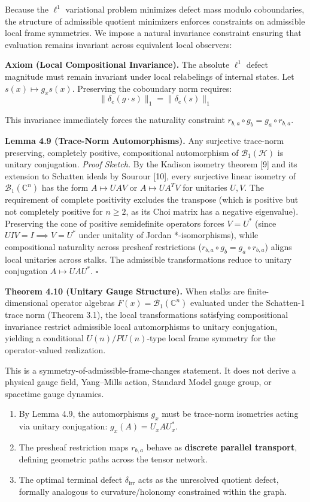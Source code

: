 \documentclass[
]{article}
\providecommand{\tightlist}{%
  \setlength{\itemsep}{0pt}\setlength{\parskip}{0pt}}
\providecommand{\tightlist}{%
  \setlength{\itemsep}{0pt}\setlength{\parskip}{0pt}}
\begin{document}
Because the \(\ell^1\) variational problem minimizes defect mass modulo coboundaries, the structure of admissible quotient minimizers enforces constraints on admissible local frame symmetries. We impose a natural invariance constraint ensuring that evaluation remains invariant across equivalent local observers:

\textbf{Axiom (Local Compositional Invariance).} The absolute \(\ell^1\) defect magnitude must remain invariant under local relabelings of internal states. Let \(s(x) \mapsto g_x s(x)\). Preserving the coboundary norm requires:
\[ \|\delta_e(g \cdot s)\|_1 = \|\delta_e(s)\|_1 \]

This invariance immediately forces the naturality constraint \(r_{b,a} \circ g_b = g_a \circ r_{b,a}\).

\textbf{Lemma 4.9 (Trace-Norm Automorphisms).} Any surjective trace-norm preserving, completely positive, compositional automorphism of \(\mathcal{B}_1(\mathcal{H})\) is unitary conjugation.
\emph{Proof Sketch.} By the Kadison isometry theorem {[}9{]} and its extension to Schatten ideals by Sourour {[}10{]}, every surjective linear isometry of \(\mathcal{B}_1(\mathbb{C}^n)\) has the form \(A \mapsto UAV\) or \(A \mapsto UA^T V\) for unitaries \(U, V\). The requirement of complete positivity excludes the transpose (which is positive but not completely positive for \(n \ge 2\), as its Choi matrix has a negative eigenvalue). Preserving the cone of positive semidefinite operators forces \(V = U^*\) (since \(U I V = I \implies V = U^*\) under unitality of Jordan *-isomorphisms), while compositional naturality across presheaf restrictions (\(r_{b,a} \circ g_b = g_a \circ r_{b,a}\)) aligns local unitaries across stalks. The admissible transformations reduce to unitary conjugation \(A \mapsto UAU^*\). \(\square\)

\textbf{Theorem 4.10 (Unitary Gauge Structure).} When stalks are finite-dimensional operator algebras \(F(x) = \mathcal{B}_1(\mathbb{C}^n)\) evaluated under the Schatten-1 trace norm (Theorem 3.1), the local transformations satisfying compositional invariance restrict admissible local automorphisms to unitary conjugation, yielding a conditional \(U(n)/PU(n)\)-type local frame symmetry for the operator-valued realization.

This is a symmetry-of-admissible-frame-changes statement. It does not derive a physical gauge field, Yang--Mills action, Standard Model gauge group, or spacetime gauge dynamics.

\begin{enumerate}
\def\labelenumi{\arabic{enumi}.}
\tightlist
\item
  By Lemma 4.9, the automorphisms \(g_x\) must be trace-norm isometries acting via unitary conjugation: \(g_x(A) = U_x A U_x^*\).
\item
  The presheaf restriction maps \(r_{b,a}\) behave as \textbf{discrete parallel transport}, defining geometric paths across the tensor network.
\item
  The optimal terminal defect \(\delta_{\text{irr}}\) acts as the unresolved quotient defect, formally analogous to curvature/holonomy constrained within the graph.
\end{enumerate}
\end{document}
